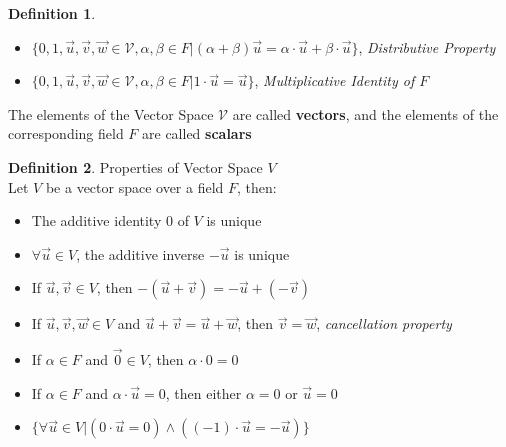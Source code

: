 \documentclass{book}
\theoremstyle{definition}
\newtheorem{definition}{Definition}[section]
\theoremstyle{remark}
\newcommand{\m}{\cdot}
\begin{document}
\begin{definition}
\begin{itemize}
            \item $\{ 0, 1, \vec{u}, \vec{v}, \vec{w} \in \mathcal{V}, \alpha, \beta \in F   | (\alpha + \beta)\vec{u} = \alpha \m \vec{u} + \beta \m \vec{u} \}$, \textit{Distributive Property}    
            \item $\{ 0, 1, \vec{u}, \vec{v}, \vec{w} \in \mathcal{V}, \alpha, \beta \in F   | 1 \m \vec{u} = \vec{u} \}$, \textit{Multiplicative Identity of $F$}  
         \end{itemize}
    The elements of the Vector Space \footnotemark $\mathcal{V}$ are called \textbf{vectors}, and the elements of the corresponding field $F$ are called \textbf{scalars}
    
\end{definition}


\begin{definition}
Properties of Vector Space $V$ \\

    Let $V$ be a vector space over a field $F$, then: 
        \begin{itemize}
            \item The additive identity $0$ of $V$ is unique
            \item $\forall \vec{u} \in V$, the additive inverse $-\vec{u}$ is unique
            \item If $\vec{u},\vec{v} \in V$, then $-(\vec{u} + \vec{v}) = -\vec{u} + (-\vec{v})$
            \item If $\vec{u}, \vec{v}, \vec{w} \in V$ and $\vec{u} + \vec{v} = \vec{u} + \vec{w}$, then $\vec{v} = \vec{w}$, \textit{cancellation property}
            \item If $\alpha \in F$ and $\vec{0} \in V$, then $\alpha \m 0 = 0$
            \item If $\alpha \in F$ and $\alpha \m \vec{u} = 0$, then either $\alpha = 0$ or $\vec{u} = 0$ 
            \item $\{ \forall \vec{u} \in V | (0 \m \vec{u} = 0) \wedge ((-1) \m \vec{u} = -\vec{u}) \}$ 
        \end{itemize}
\end{definition}
\end{document}

